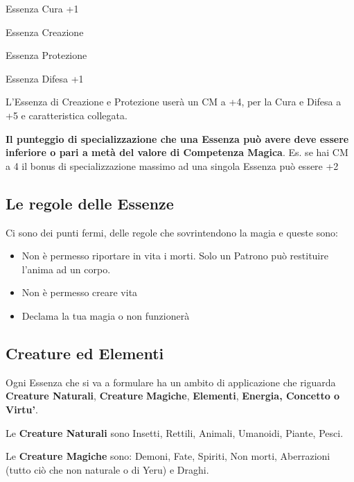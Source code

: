 \documentclass[a4paper,11pt,twoside,openany]{book}
\begin{document}
Essenza Cura +1

Essenza Creazione

Essenza Protezione

Essenza Difesa +1

L'Essenza di Creazione e Protezione userà un CM a +4, per la Cura e Difesa a +5 e caratteristica collegata.

\bigskip

\textbf{Il punteggio di specializzazione che una Essenza può avere deve essere inferiore o pari a metà del valore di Competenza Magica}. Es. se hai CM a 4 il bonus di specializzazione massimo ad una singola Essenza può essere +2

\subsection{Le regole delle Essenze}

\label{le-regole-delle-essenze}

Ci sono dei punti fermi, delle regole che sovrintendono la magia e queste sono:
\begin{itemize}
\item Non è permesso riportare in vita i morti. Solo un Patrono può restituire l'anima ad un corpo. 

\item Non è permesso creare vita 

\item Declama la tua magia o non funzionerà 

\end{itemize}

\subsection{Creature ed Elementi}

\label{creature-ed-elementi}

Ogni Essenza che si va a formulare ha un ambito di applicazione che riguarda \textbf{Creature Naturali}, \textbf{Creature} \textbf{Magiche},
\textbf{Elementi}, \textbf{Energia, Concetto o Virtu'}.
\bigskip

Le \textbf{Creature Naturali} sono Insetti, Rettili, Animali, Umanoidi, Piante, Pesci.

Le \textbf{Creature Magiche} sono: Demoni, Fate, Spiriti, Non morti, Aberrazioni (tutto ciò che non naturale o di Yeru) e Draghi.
\end{document}
